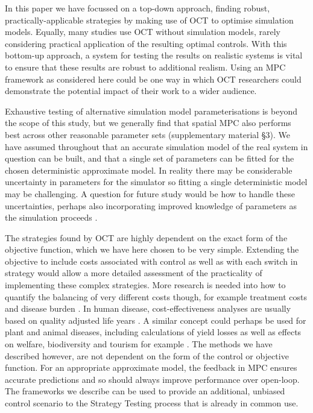 In this paper we have focussed on a top-down approach, finding robust, practically-applicable strategies by making use of OCT to optimise simulation models. Equally, many studies use OCT without simulation models, rarely considering practical application of the resulting optimal controls. With this bottom-up approach, a system for testing the results on realistic systems is vital to ensure that these results are robust to additional realism. Using an MPC framework as considered here could be one way in which OCT researchers could demonstrate the potential impact of their work to a wider audience.

Exhaustive testing of alternative simulation model parameterisations is beyond the scope of this study, but we generally find that spatial MPC also performs best across other reasonable parameter sets (supplementary material \S3). We have assumed throughout that an accurate simulation model of the real system in question can be built, and that a single set of parameters can be fitted for the chosen deterministic approximate model. In reality there may be considerable uncertainty in parameters for the simulator so fitting a single deterministic model may be challenging. A question for future study would be how to handle these uncertainties, perhaps also incorporating improved knowledge of parameters as the simulation proceeds \citep{thompson_control_2018}.

The strategies found by OCT are highly dependent on the exact form of the objective function, which we have here chosen to be very simple. Extending the objective to include costs associated with control as well as with each switch in strategy would allow a more detailed assessment of the practicality of implementing these complex strategies. More research is needed into how to quantify the balancing of very different costs though, for example treatment costs and disease burden \citep{rowthorn_optimal_2009}. In human disease, cost-effectiveness analyses are usually based on quality adjusted life years \citep{whitehead_health_2010}. A similar concept could perhaps be used for plant and animal diseases, including calculations of yield losses \citep{savary_crop_2012} as well as effects on welfare, biodiversity and tourism for example \citep{boyd_consequence_2013}. The methods we have described however, are not dependent on the form of the control or objective function. For an appropriate approximate model, the feedback in MPC ensures accurate predictions and so should always improve performance over open-loop. The frameworks we describe can be used to provide an additional, unbiased control scenario to the Strategy Testing process that is already in common use.

